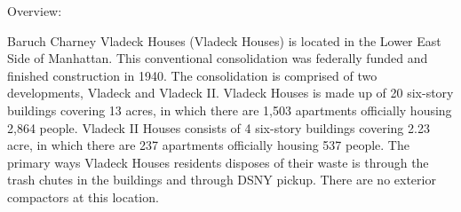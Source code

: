 Overview:

Baruch Charney Vladeck Houses (Vladeck Houses) is located in the Lower East Side of Manhattan. This conventional consolidation was federally funded and finished construction in 1940. The consolidation is comprised of two developments, Vladeck and Vladeck II. Vladeck Houses is made up of 20 six-story buildings covering 13 acres, in which there are 1,503 apartments officially housing 2,864 people. Vladeck II Houses consists of 4 six-story buildings covering 2.23 acre, in which there are 237 apartments officially housing 537 people. The primary ways Vladeck Houses residents disposes of their waste is through the trash chutes in the buildings and through DSNY pickup. There are no exterior compactors at this location.
